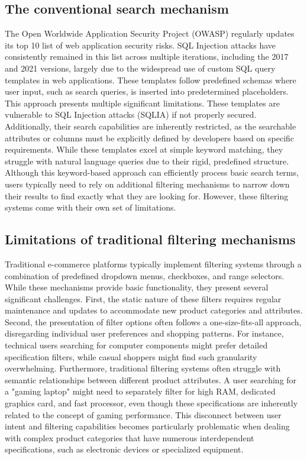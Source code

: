 \documentclass[../../submission.tex]{subfiles}
\begin{document}
\subsection{The conventional search mechanism}
The Open Worldwide Application Security Project (OWASP) regularly updates its top 10 list of web application security risks.
SQL Injection attacks have consistently remained in this list across multiple iterations, including the 2017 and 2021 versions,
largely due to the widespread use of custom SQL query templates in web applications\cite{owaspfoundationOWASPTopTen2024}. These templates
follow predefined schemas where user input, such as search queries, is inserted into predetermined placeholders. This approach
presents multiple significant limitations. These templates are vulnerable to SQL Injection attacks (SQLIA) if 
not properly secured. Additionally, their search capabilities are inherently restricted, as the searchable attributes 
or columns must be explicitly defined by developers based on specific requirements. While these templates excel at 
simple keyword matching, they 
struggle with natural language queries due to their rigid, predefined structure. Although this keyword-based 
approach can efficiently process basic search terms, users typically need to rely on additional filtering 
mechanisms to narrow down their results to find exactly what they are looking for. However, these filtering 
systems come with their own set of limitations.

\subsection{Limitations of traditional filtering mechanisms}
Traditional e-commerce platforms typically implement filtering systems through a combination of 
predefined dropdown menus, checkboxes, and range selectors. While these mechanisms provide basic 
functionality, they present several significant challenges. First, the static nature of these 
filters requires regular maintenance and updates to accommodate new product categories and attributes. 
Second, the presentation of filter options often follows a one-size-fits-all approach, disregarding 
individual user preferences and shopping patterns. For instance, technical users searching for computer 
components might prefer detailed specification filters, while casual shoppers might find such granularity 
overwhelming. Furthermore, traditional filtering systems often struggle with semantic relationships between 
different product attributes. A user searching for a "gaming laptop" might need to separately filter for 
high RAM, dedicated graphics card, and fast processor, even though these specifications are inherently 
related to the concept of gaming performance. This disconnect between user intent and filtering 
capabilities becomes particularly problematic when dealing with complex product categories that 
have numerous interdependent specifications, such as electronic devices or specialized equipment.
\end{document}
